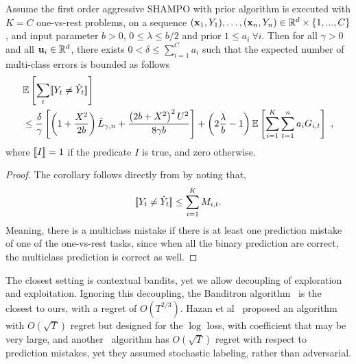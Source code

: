 \begin{corollary}
Assume the first order aggressive SHAMPO with prior algorithm is executed with $K=C$ one-vs-rest 
problems, on a sequence 
$(\mathbf{x}_1,Y_1),\ldots,(\mathbf{x}_n,Y_n)\in\mathbb{R}^d\times\{1,...,C\}$, and input parameter $b>0$,  
$0 \le \lambda \le b/2$  and prior 
$1\le a_i~\forall i$. Then for all $\gamma>0$ and all $\mathbf{u}_{i}\in\mathbb{R}^d$, there 
exists $0<\delta\le \sum_{i=1}^{C}a_{i}$ such that the expected number of multi-class errors is bounded as follows
 \[
 \begin{split}
 &\mathbb{E}\left[{\sum_t [\![{Y_t \neq \hat{Y}_t}]\!]}\right]\\
 &\le \frac{\delta}{\gamma}\left[{\left(1+\frac{X^2}{2b} \right){\bar L}_{\gamma,n}+
 \frac{\left({2b+X^2}\right)^2U^2}{8{\gamma}b}}\right]
 +\left({2\frac{\lambda}{b}-1}\right)\mathbb{E}\left[{\sum_{i=1}^{K}\sum_{t=1}^{n}{a_{i}G_{i,t}}}\right]~,
 \end{split}
 \]
where $[\![{I}]\!]=1$ if the predicate $I$ is true, and zero otherwise.
\end{corollary}

\begin{proof}
 The corollary follows directly from  by noting that,
 \begin{equation*} 
[\![{Y_t \neq \hat{Y}_t}]\!] \leq \sum_{i=1}^{K} M_{i,t}.
 \end{equation*}
Meaning, there is a multiclass mistake if there is at least one 
prediction mistake of one of the one-vs-rest tasks, since when all the binary 
prediction are correct, the multiclass prediction is correct as well.
\QED
\end{proof}

\noindent
 The closest setting is contextual bandits, yet we 
allow decoupling of exploration and exploitation. Ignoring this decoupling, the 
Banditron algorithm~\cite{kakade2008efficient} is the closest to ours, 
with a regret of $O(T^{2/3})$. Hazan et al~\cite{hazan2011newtron} proposed an algorithm 
with $O(\sqrt{T})$ regret but designed for the $\log$ loss, with coefficient that may be very large, and 
another~\cite{DBLP:journals/ml/CrammerG13} algorithm has $O(\sqrt{T})$ regret with respect to prediction 
mistakes, yet they assumed stochastic labeling, rather than adversarial.


